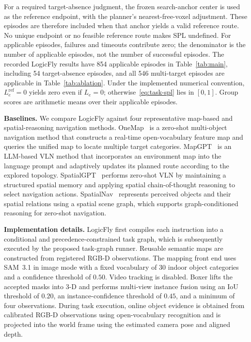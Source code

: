 \documentclass[letterpaper,10pt,journal]{IEEEtran}
\begin{document}
For a required target-absence judgment, the frozen search-anchor center is used as the reference endpoint, with the planner's nearest-free-voxel adjustment. These episodes are therefore included when that anchor yields a valid reference route. No unique endpoint or no feasible reference route makes SPL undefined. For applicable episodes, failures and timeouts contribute zero; the denominator is the number of applicable episodes, not the number of successful episodes. The recorded LogicFly results have 854 applicable episodes in Table~\ref{tab:main}, including 54 target-absence episodes, and all 546 multi-target episodes are applicable in Table~\ref{tab:ablation}. Under the implemented numerical convention, $L_e^{\mathrm{ref}}=0$ yields zero even if $L_e=0$; otherwise~\eqref{eq:task-spl} lies in $[0,1]$. Group scores are arithmetic means over their applicable episodes.

\textbf{Baselines.}
We compare LogicFly against four representative map-based and spatial-reasoning navigation methods. OneMap~\cite{busch2025onemap} is a zero-shot multi-object navigation method that constructs a real-time open-vocabulary feature map and queries the unified map to locate multiple target categories. MapGPT~\cite{chen2024mapgpt} is an LLM-based VLN method that incorporates an environment map into the language prompt and adaptively updates its planned route according to the explored topology. SpatialGPT~\cite{jiang2025spatialgpt} performs zero-shot VLN by maintaining a structured spatial memory and applying spatial chain-of-thought reasoning to select navigation actions. SpatialNav~\cite{zhang2026spatialnav} represents perceived objects and their spatial relations using a spatial scene graph, which supports graph-conditioned reasoning for zero-shot navigation.

\textbf{Implementation details.}
LogicFly first compiles each instruction into a conditional and precedence-constrained task graph, which is subsequently executed by the proposed task-graph runner. Reusable semantic maps are constructed from registered RGB-D observations. The mapping front end uses SAM~3.1 in image mode with a fixed vocabulary of 30 indoor object categories and a confidence threshold of $0.50$. Video tracking is disabled. Boxer lifts the accepted masks into 3-D and performs multi-view instance fusion using an IoU threshold of $0.20$, an instance-confidence threshold of $0.45$, and a minimum of four observations. During task execution, online object evidence is obtained from calibrated RGB-D observations using open-vocabulary recognition and is projected into the world frame using the estimated camera pose and aligned depth.
\end{document}
